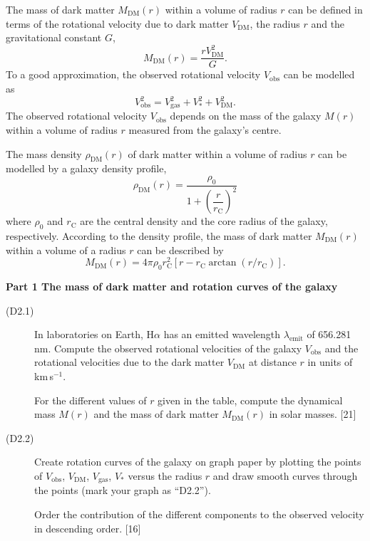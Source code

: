 The mass of dark matter $M_{\mathrm{DM}}(r)$ within a volume of radius $r$ can
be defined in terms of the rotational velocity due to dark matter
$V_{\mathrm{DM}}$, the radius $r$ and the gravitational constant $G$,
\begin{equation}
M_{\mathrm{DM}}(r) = \frac{rV_{\mathrm{DM}}^2}{G}. \tag{1}
\end{equation}
To a good approximation, the observed rotational velocity $V_{\mathrm{obs}}$
can be modelled as
\begin{equation}
V_{\mathrm{obs}}^2 = V_{\mathrm{gas}}^2 + V_*^2 + V_{\mathrm{DM}}^2.
\tag{2}
\end{equation}
The observed rotational velocity $V_{\mathrm{obs}}$ depends on the mass of the
galaxy $M(r)$ within a volume of radius $r$ measured from the galaxy's centre.

The mass density $\rho_{\mathrm{DM}}(r)$ of dark matter within a volume of
radius $r$ can be modelled by a galaxy density profile,
\begin{equation}
\rho_{\mathrm{DM}}(r)
  = \frac{\rho_0}{1 + \left(\dfrac{r}{r_{\mathrm{C}}}\right)^2}
\tag{3}
\end{equation}
where $\rho_0$ and $r_{\mathrm{C}}$ are the central density and the core
radius of the galaxy, respectively. According to the density profile, the mass
of dark matter $M_{\mathrm{DM}}(r)$ within a volume of a radius $r$ can be
described by
\begin{equation}
M_{\mathrm{DM}}(r) = 4\pi\rho_0 r_{\mathrm{C}}^2
  \left[r - r_{\mathrm{C}}\arctan(r/r_{\mathrm{C}})\right].
\tag{4}
\end{equation}

\medskip
\textbf{Part 1 The mass of dark matter and rotation curves of the galaxy}

\begin{description}
\item[(D2.1)] In laboratories on Earth, H$\alpha$ has an emitted wavelength
  $\lambda_{\mathrm{emit}}$ of 656.281\,nm. Compute the observed rotational
  velocities of the galaxy $V_{\mathrm{obs}}$ and the rotational velocities
  due to the dark matter $V_{\mathrm{DM}}$ at distance $r$ in units of
  km\,s$^{-1}$.

  For the different values of $r$ given in the table, compute the dynamical
  mass $M(r)$ and the mass of dark matter $M_{\mathrm{DM}}(r)$ in solar
  masses. \hfill[21]
\item[(D2.2)] Create rotation curves of the galaxy on graph paper by plotting
  the points of $V_{\mathrm{obs}}$, $V_{\mathrm{DM}}$, $V_{\mathrm{gas}}$,
  $V_*$ versus the radius $r$ and draw smooth curves through the points (mark
  your graph as ``D2.2'').

  Order the contribution of the different components to the observed velocity
  in descending order. \hfill[16]
\end{description}

